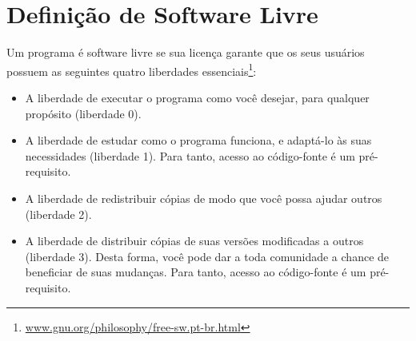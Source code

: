 
\chapter{Definição de Software Livre}
\label{ann:softlivre}

Um programa é software livre se sua licença garante que os seus usuários possuem as seguintes quatro liberdades essenciais\footnote{\url{www.gnu.org/philosophy/free-sw.pt-br.html}}:
\begin{itemize}
  \item A liberdade de executar o programa como você desejar, para qualquer propósito (liberdade 0).
  \item A liberdade de estudar como o programa funciona, e adaptá-lo às suas necessidades (liberdade 1). Para tanto, acesso ao código-fonte é um pré-requisito.
  \item A liberdade de redistribuir cópias de modo que você possa ajudar outros (liberdade 2).
  \item A liberdade de distribuir cópias de suas versões modificadas a outros (liberdade 3). Desta forma, você pode dar a toda comunidade a chance de beneficiar de suas mudanças. Para tanto, acesso ao código-fonte é um pré-requisito.
\end{itemize}
